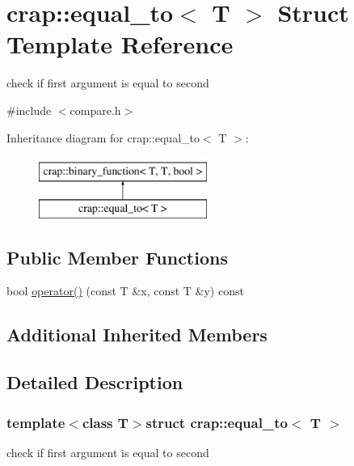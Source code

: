 \hypertarget{structcrap_1_1equal__to}{\section{crap\-:\-:equal\-\_\-to$<$ T $>$ Struct Template Reference}
\label{structcrap_1_1equal__to}
}


check if first argument is equal to second  




{\ttfamily \#include $<$compare.\-h$>$}

Inheritance diagram for crap\-:\-:equal\-\_\-to$<$ T $>$\-:\begin{figure}[H]
\begin{center}
\leavevmode
\includegraphics[height=2.000000cm]{structcrap_1_1equal__to}
\end{center}
\end{figure}
\subsection*{Public Member Functions}
\begin{DoxyCompactItemize}
\item 
bool \hyperlink{structcrap_1_1equal__to_a8b7c3c4cb07f59563639f589082dd2b6}{operator()} (const T \&x, const T \&y) const 
\end{DoxyCompactItemize}
\subsection*{Additional Inherited Members}


\subsection{Detailed Description}
\subsubsection*{template$<$class T$>$struct crap\-::equal\-\_\-to$<$ T $>$}

check if first argument is equal to second 

